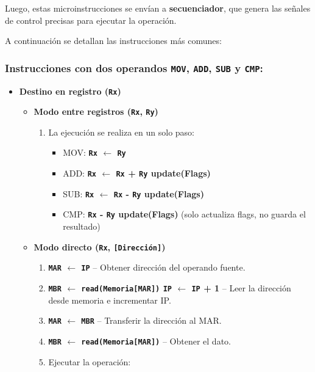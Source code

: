 \documentclass[12pt,oneside]{templates/unerthesis}
\providecommand{\tightlist}{%
  \setlength{\itemsep}{0pt}\setlength{\parskip}{0pt}}
\begin{document}
Luego, estas microinstrucciones se envían a \textbf{secuenciador}, que genera las señales de control precisas para ejecutar la operación.

A continuación se detallan las instrucciones más comunes:

\hypertarget{instrucciones-con-dos-operandos-mov-add-sub-y-cmp}{%
\subsubsection{\texorpdfstring{Instrucciones con dos operandos \texttt{MOV}, \texttt{ADD}, \texttt{SUB} y \texttt{CMP}:}{Instrucciones con dos operandos MOV, ADD, SUB y CMP:}}\label{instrucciones-con-dos-operandos-mov-add-sub-y-cmp}}

\begin{itemize}
\tightlist
\item
  \textbf{Destino en registro (\texttt{Rx})}

  \begin{itemize}
  \tightlist
  \item
    \textbf{Modo entre registros (\texttt{Rx}, \texttt{Ry})}

    \begin{enumerate}
    \def\labelenumi{\arabic{enumi}.}
    \setcounter{enumi}{3}
    \tightlist
    \item
      La ejecución se realiza en un solo paso:

      \begin{itemize}
      \tightlist
      \item
        MOV: \textbf{\texttt{Rx} \(\leftarrow\) \texttt{Ry}}
      \item
        ADD: \textbf{\texttt{Rx} \(\leftarrow\) \texttt{Rx} + \texttt{Ry} \textbar{} update(Flags)}
      \item
        SUB: \textbf{\texttt{Rx} \(\leftarrow\) \texttt{Rx} - \texttt{Ry} \textbar{} update(Flags)}
      \item
        CMP: \textbf{\texttt{Rx} - \texttt{Ry} \textbar{} update(Flags)} (solo actualiza flags, no guarda el resultado)
      \end{itemize}
    \end{enumerate}
  \item
    \textbf{Modo directo (\texttt{Rx}, \texttt{{[}Dirección{]}})}

    \begin{enumerate}
    \def\labelenumi{\arabic{enumi}.}
    \setcounter{enumi}{3}
    \tightlist
    \item
      \textbf{\texttt{MAR} \(\leftarrow\) \texttt{IP}} -- Obtener dirección del operando fuente.
    \item
      \textbf{\texttt{MBR} \(\leftarrow\) \texttt{read(Memoria{[}MAR{]})} \textbar{} \texttt{IP} \(\leftarrow\) \texttt{IP} + 1} -- Leer la dirección desde memoria e incrementar IP.
    \item
      \textbf{\texttt{MAR} \(\leftarrow\) \texttt{MBR}} -- Transferir la dirección al MAR.
    \item
      \textbf{\texttt{MBR} \(\leftarrow\) \texttt{read(Memoria{[}MAR{]})}} -- Obtener el dato.
    \item
      Ejecutar la operación:


\end{enumerate}
\end{itemize}
\end{itemize}
\end{document}
